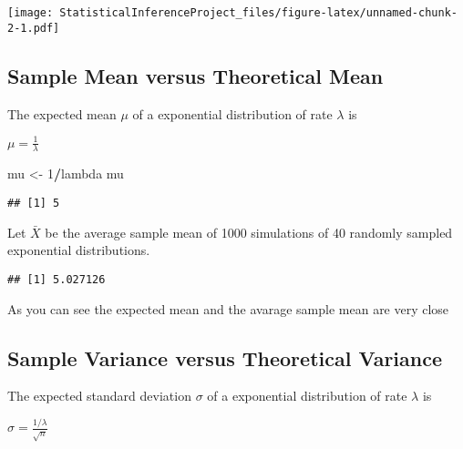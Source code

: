 \documentclass[
]{article}
\newenvironment{Shaded}{\begin{snugshade}}{\end{snugshade}}
\newcommand{\DecValTok}[1]{\textcolor[rgb]{0.00,0.00,0.81}{#1}}
\newcommand{\KeywordTok}[1]{\textcolor[rgb]{0.13,0.29,0.53}{\textbf{#1}}}
\newcommand{\NormalTok}[1]{#1}
\newcommand{\OperatorTok}[1]{\textcolor[rgb]{0.81,0.36,0.00}{\textbf{#1}}}
\newcommand{\StringTok}[1]{\textcolor[rgb]{0.31,0.60,0.02}{#1}}
\begin{document}
\texttt{[image: StatisticalInferenceProject\_files/figure-latex/unnamed-chunk-2-1.pdf]}

\hypertarget{sample-mean-versus-theoretical-mean}{%
\subsection{Sample Mean versus Theoretical
Mean}\label{sample-mean-versus-theoretical-mean}}

The expected mean \(\mu\) of a exponential distribution of rate
\(\lambda\) is

\(\mu= \frac{1}{\lambda}\)

\begin{Shaded}
\begin{Highlighting}[]
\NormalTok{mu <-}\StringTok{ }\DecValTok{1}\OperatorTok{/}\NormalTok{lambda}
\NormalTok{mu}
\end{Highlighting}
\end{Shaded}

\begin{verbatim}
## [1] 5
\end{verbatim}

Let \(\bar X\) be the average sample mean of 1000 simulations of 40
randomly sampled exponential distributions.

\begin{Shaded}
\end{Shaded}

\begin{verbatim}
## [1] 5.027126
\end{verbatim}

As you can see the expected mean and the avarage sample mean are very
close

\hypertarget{sample-variance-versus-theoretical-variance}{%
\subsection{Sample Variance versus Theoretical
Variance}\label{sample-variance-versus-theoretical-variance}}

The expected standard deviation \(\sigma\) of a exponential distribution
of rate \(\lambda\) is

\(\sigma = \frac{1/\lambda}{\sqrt{n}}\)
\end{document}
